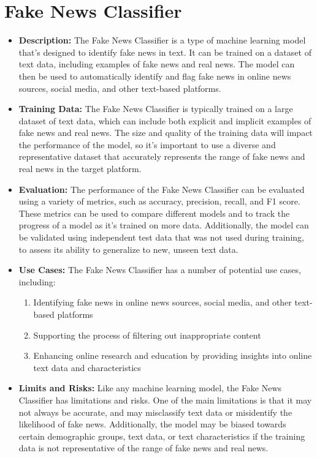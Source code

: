 \section{Fake News Classifier}

\begin{itemize}
    \item \textbf{Description:} The Fake News Classifier is a type of machine learning model that's designed to identify fake news in text. It can be trained on a dataset of text data, including examples of fake news and real news. The model can then be used to automatically identify and flag fake news in online news sources, social media, and other text-based platforms.
    \item \textbf{Training Data:} The Fake News Classifier is typically trained on a large dataset of text data, which can include both explicit and implicit examples of fake news and real news. The size and quality of the training data will impact the performance of the model, so it's important to use a diverse and representative dataset that accurately represents the range of fake news and real news in the target platform.
    \item \textbf{Evaluation:} The performance of the Fake News Classifier can be evaluated using a variety of metrics, such as accuracy, precision, recall, and F1 score. These metrics can be used to compare different models and to track the progress of a model as it's trained on more data. Additionally, the model can be validated using independent test data that was not used during training, to assess its ability to generalize to new, unseen text data.
    \item \textbf{Use Cases:} The Fake News Classifier has a number of potential use cases, including:
        \begin{enumerate}  
            \item Identifying fake news in online news sources, social media, and other text-based platforms
            \item Supporting the process of filtering out inappropriate content
            \item Enhancing online research and education by providing insights into online text data and characteristics
        \end{enumerate}
    \item \textbf{Limits and Risks:} Like any machine learning model, the Fake News Classifier has limitations and risks. One of the main limitations is that it may not always be accurate, and may misclassify text data or misidentify the likelihood of fake news. Additionally, the model may be biased towards certain demographic groups, text data, or text characteristics if the training data is not representative of the range of fake news and real news.

\end{itemize}
